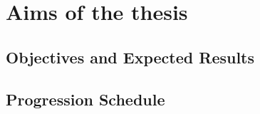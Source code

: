 \chapter{Aims of the thesis}
\label{ch:aim}




\section{Objectives and Expected Results}









\section{Progression Schedule}
